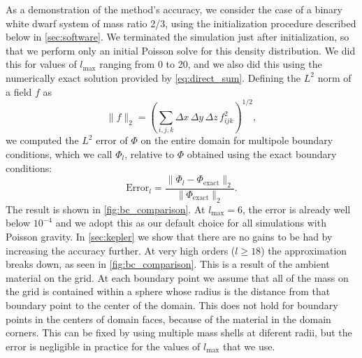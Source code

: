 \documentclass[12pt]{article}
\begin{document}
As a demonstration of the method's accuracy, we consider the case of a binary white dwarf
system of mass ratio 2/3, using the initialization procedure described below 
in \autoref{sec:software}. We terminated the simulation just after
initialization, so that we perform only an initial Poisson solve for this 
density distribution. We did this for values of $l_{\text{max}}$ ranging
from 0 to 20, and we also did this using the numerically exact solution 
provided by \autoref{eq:direct_sum}.  Defining the $L^2$
norm of a field $f$ as
\begin{equation}
  \| f \|_2 = \left(\sum_{i,j,k} \Delta x\, \Delta y\, \Delta z\, f_{ijk}^2\right)^{1/2},
\end{equation}
we computed the $L^2$ error of $\Phi$ on the entire domain for multipole 
boundary conditions, which we call $\Phi_l$, relative to $\Phi$ 
obtained using the exact boundary conditions:
\begin{equation}
  \text{Error}_l = \frac{\|\Phi_l - \Phi_{\text{exact}}\|_2}{\|\Phi_{\text{exact}}\|_2}.
\end{equation}
The result is shown in \autoref{fig:bc_comparison}. At $l_{\text{max}} = 6$,
the error is already well below $10^{-4}$ and we adopt this as our default 
choice for all simulations with Poisson gravity. In \autoref{sec:kepler} we 
show that there are no gains to be had by increasing the accuracy further. At 
very high orders ($l \ge 18$) the approximation breaks down, as seen in \autoref{fig:bc_comparison}. 
This is a result of the ambient material on the grid. At each boundary point we 
assume that all of the mass on the grid is contained within a sphere whose radius is 
the distance from that boundary point to the center of the domain. This does not hold 
for boundary points in the centers of domain faces, because of the material in the 
domain corners. This can be fixed by using multiple mass shells at diferent radii, but the error 
is negligible in practice for the values of $l_{\text{max}}$ that we use.
\end{document}
